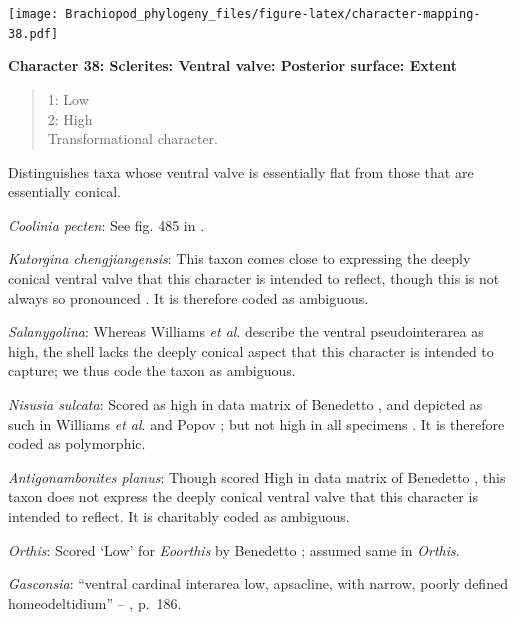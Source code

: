\documentclass[]{book}
\theoremstyle{definition}
\theoremstyle{definition}
\theoremstyle{definition}
\theoremstyle{remark}
\begin{document}
\texttt{[image: Brachiopod\_phylogeny\_files/figure-latex/character-mapping-38.pdf]}

\textbf{Character 38: Sclerites: Ventral valve: Posterior surface:
Extent}

\begin{quote}
1: Low\\
2: High\\
Transformational character.
\end{quote}

Distinguishes taxa whose ventral valve is essentially flat from those
that are essentially conical.

\emph{Coolinia pecten}: See fig. 485 in
\citet{Williams2000BrachiopodaLinguliformea}.

\emph{Kutorgina chengjiangensis}: This taxon
\citetext{\citealp[see][fig.
129]{Williams2000BrachiopodaLinguliformea}; \citealp[fig.
1]{Popov1992TheCambrian}} comes close to expressing the deeply conical
ventral valve that this character is intended to reflect, though this is
not always so pronounced \citep[e.g.][fig.
125]{Williams2000BrachiopodaLinguliformea}. It is therefore coded as
ambiguous.

\emph{Salanygolina}: Whereas Williams \emph{et al}.
\citeyearpar[p.~156]{Williams2000BrachiopodaLinguliformea} describe the
ventral pseudointerarea as high, the shell lacks the deeply conical
aspect that this character is intended to capture; we thus code the
taxon as ambiguous.

\emph{Nisusia sulcata}: Scored as high in data matrix of Benedetto
\citeyearpar{Benedetto2009iChaniella}, and depicted as such in Williams
\emph{et al}. \citeyearpar[fig.
125]{Williams2000BrachiopodaLinguliformea} and Popov \citeyearpar[fig.
1]{Popov1992TheCambrian}; but not high in all specimens
\citep[e.g.][fig. 126]{Williams2000BrachiopodaLinguliformea}. It is
therefore coded as polymorphic.

\emph{Antigonambonites planus}: Though scored High in data matrix of
Benedetto \citeyearpar{Benedetto2009iChaniella}, this taxon
\citep[see][fig. 508]{Williams2000BrachiopodaLinguliformea} does not
express the deeply conical ventral valve that this character is intended
to reflect. It is charitably coded as ambiguous.

\emph{Orthis}: Scored `Low' for \emph{Eoorthis} by Benedetto
\citeyearpar{Benedetto2009iChaniella}; assumed same in \emph{Orthis}.

\emph{Gasconsia}: ``ventral cardinal interarea low, apsacline, with
narrow, poorly defined homeodeltidium'' --
\citet{Williams2000BrachiopodaLinguliformea}, p.~186.
\end{document}
